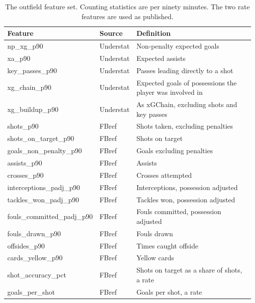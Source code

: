 \begin{table}[t]
\centering
\small
\caption{The outfield feature set. Counting statistics are per ninety minutes. The two rate features are used as published.}
\label{tab:features}
\begin{tabular}{llp{7.2cm}}
\toprule
Feature & Source & Definition \\
\midrule
np\_xg\_p90 & Understat & Non-penalty expected goals \\
xa\_p90 & Understat & Expected assists \\
key\_passes\_p90 & Understat & Passes leading directly to a shot \\
xg\_chain\_p90 & Understat & Expected goals of possessions the player was involved in \\
xg\_buildup\_p90 & Understat & As xGChain, excluding shots and key passes \\
shots\_p90 & FBref & Shots taken, excluding penalties \\
shots\_on\_target\_p90 & FBref & Shots on target \\
goals\_non\_penalty\_p90 & FBref & Goals excluding penalties \\
assists\_p90 & FBref & Assists \\
crosses\_p90 & FBref & Crosses attempted \\
interceptions\_padj\_p90 & FBref & Interceptions, possession adjusted \\
tackles\_won\_padj\_p90 & FBref & Tackles won, possession adjusted \\
fouls\_committed\_padj\_p90 & FBref & Fouls committed, possession adjusted \\
fouls\_drawn\_p90 & FBref & Fouls drawn \\
offsides\_p90 & FBref & Times caught offside \\
cards\_yellow\_p90 & FBref & Yellow cards \\
shot\_accuracy\_pct & FBref & Shots on target as a share of shots, a rate \\
goals\_per\_shot & FBref & Goals per shot, a rate \\
\bottomrule
\end{tabular}
\end{table}
